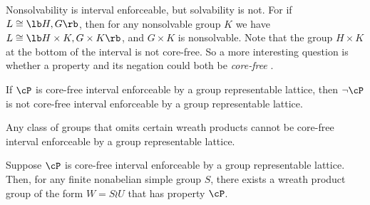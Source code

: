 \begin{frame}[label=IEPropsConjecture]{}
Nonsolvability is interval enforceable, but solvability is not. 
\vskip4mm
For if $L\cong \lb H, G \rb$, then for any nonsolvable 
group $K$ we have $L\cong \lb H\times K, G\times K\rb$, and $G\times K$ is
nonsolvable.  
\vskip4mm
Note that the group $H\times K$ at the bottom of
the interval is not core-free.  So a more interesting question is whether a
property and its negation could both be \emph{core-free} \IE.  
\vskip4mm
\begin{conjecture}
\label{conjecture:isle-prop2}
If $\cP$ is core-free interval enforceable by a group representable lattice,
then $\neg \cP$ is not core-free interval enforceable by a group representable lattice.
\end{conjecture}
\end{frame}

\begin{frame}[label=IEPropsLemma2]{}
Any class of groups that omits certain wreath products cannot be core-free
interval enforceable by a group representable lattice. 
\vskip4mm
\begin{theorem}
Suppose $\cP$ is core-free interval enforceable by a group
representable lattice.   
Then, for any finite nonabelian simple group $S$, there exists a wreath product group
of the form $W = S\wr U$ that has property $\cP$. 
\end{theorem}
\vskip4mm
\end{frame}


